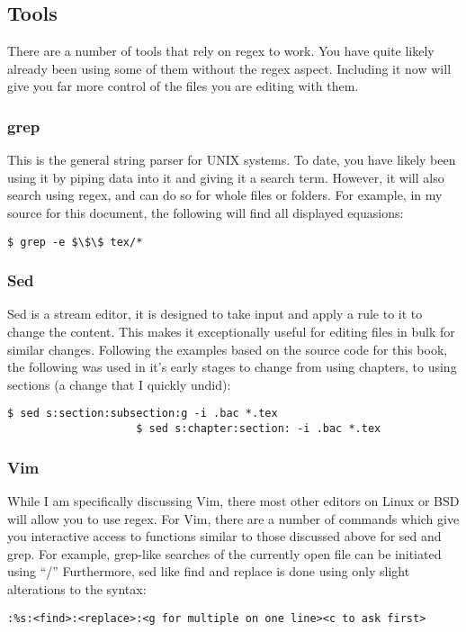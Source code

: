 		\subsection{Tools}
			There are a number of tools that rely on regex to work.
			You have quite likely already been using some of them without the regex aspect.
			Including it now will give you far more control of the files you are editing with them.

			\subsubsection{grep}
				This is the general string parser for UNIX systems.
				To date, you have likely been using it by piping data into it and giving it a search term.
				However, it will also search using regex, and can do so for whole files or folders.
				For example, in my source for this document, the following will find all displayed equasions:
				\begin{lstlisting}[style=CLI]
					$ grep -e $\$\$ tex/*
				\end{lstlisting}
			\subsubsection{Sed}
				Sed is a stream editor, it is designed to take input and apply a rule to it to change the content.
				This makes it exceptionally useful for editing files in bulk for similar changes.
				Following the examples based on the source code for this book, the following was used in it's early stages to change from using chapters, to using sections (a change that I quickly undid):
				\begin{lstlisting}[style=CLI]
					$ sed s:section:subsection:g -i .bac *.tex
					$ sed s:chapter:section: -i .bac *.tex
				\end{lstlisting} %
			\subsubsection{Vim}
				While I am specifically discussing Vim, there most other editors on Linux or BSD will allow you to use regex.
				For Vim, there are a number of commands which give you interactive access to functions similar to those discussed above for sed and grep.
				For example, grep-like searches of the currently open file can be initiated using ``/''
				Furthermore, sed like find and replace is done using only slight alterations to the syntax:
				\begin{lstlisting}[numbers=none]
:%s:<find>:<replace>:<g for multiple on one line><c to ask first>
				\end{lstlisting}

